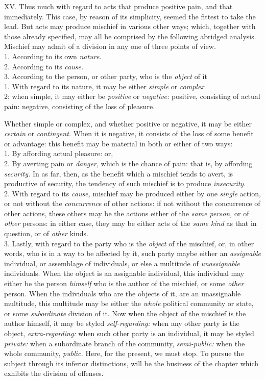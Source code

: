 \documentclass[12pt]{report}
\begin{document}
XV. Thus much with regard to acts that produce positive pain, and that
immediately. This case, by reason of its simplicity, seemed the fittest
to take the lead. But acts may produce mischief in various other ways;
which, together with those already specified, may all be comprised by
the following abridged analysis.\\
Mischief may admit of a division in any one of three points of view.\\
1. According to its own \emph{nature.}\\
2. According to its \emph{cause.}\\
3. According to the person, or other party, who is the \emph{object} of
it\\
1. With regard to its nature, it may be either \emph{simple} or
\emph{complex}\\
2: when simple, it may either be \emph{positive} or \emph{negative:}
positive, consisting of actual pain: negative, consisting of the loss of
pleasure.

Whether simple or complex, and whether positive or negative, it may be
either \emph{certain} or \emph{contingent.} When it is negative, it
consists of the loss of some benefit or advantage: this benefit may be
material in both or either of two ways:\\
1. By affording actual pleasure: or,\\
2. By averting pain or \emph{danger,} which is the chance of pain: that
is, by affording \emph{security.} In as far, then, as the benefit which
a mischief tends to avert, is productive of security, the tendency of
such mischief is to produce \emph{insecurity.}\\
2. With regard to its \emph{cause,} mischief may be produced either by
one \emph{single} action, or not without the \emph{concurrence} of other
actions: if not without the concurrence of other actions, these others
may be the actions either of the \emph{same person,} or of \emph{other}
persons: in either case, they may be either acts of the \emph{same kind}
as that in question, or of \emph{other} kinds.\\
3. Lastly, with regard to the party who is the \emph{object} of the
mischief, or, in other words, who is in a way to be affected by it, such
party maybe either an \emph{assignable} individual, or assemblage of
individuals, or else a multitude of \emph{unassignable} individuals.
When the object is an assignable individual, this individual may either
be the person \emph{himself} who is the author of the mischief, or some
\emph{other} person. When the individuals who are the objects of it, are
an unassignable multitude, this multitude may be either the \emph{whole}
political community or state, or some \emph{subordinate} division of it.
Now when the object of the mischief is the author himself, it may be
styled \emph{self-regarding:} when any other party is the object,
\emph{extra-regarding:} when such other party is an individual, it may
be styled \emph{private:} when a subordinate branch of the community,
\emph{semi-public:} when the whole community, \emph{public.} Here, for
the present, we must stop. To pursue the subject through its inferior
distinctions, will be the business of the chapter which exhibits the
division of offenses.
\end{document}
